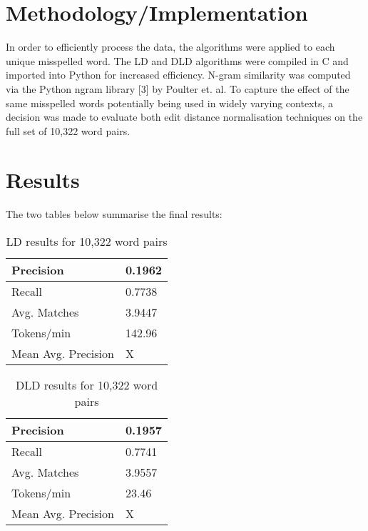 \documentclass[11pt]{article}
\begin{document}
\section{Methodology/Implementation}
In order to efficiently process the data, the algorithms were applied to each unique misspelled word.
The LD and DLD algorithms were compiled in C and imported into Python for increased efficiency. N-gram
similarity was computed via the Python ngram library [3] by Poulter et. al. To capture the effect of the same misspelled words potentially being used in widely varying contexts, a decision was made to evaluate both edit distance normalisation techniques on the full set of 10,322 word pairs. 


\section{Results}
The two tables below summarise the final results:

\begin{table}[h]
\begin{center}
\begin{tabular}{|l|l|}
      \hline
      Precision & 0.1962\\
      \hline
      Recall & 0.7738\\
      \hline
      Avg. Matches & 3.9447\\
      \hline
      Tokens/min & 142.96\\
      \hline
      Mean Avg. Precision & X\\
      \hline
\end{tabular}
\caption{LD results for 10,322 word pairs}\label{table1}
\end{center}
\end{table}


\begin{table}[h]
\begin{center}
\begin{tabular}{|l|l|}
      \hline
      Precision & 0.1957\\
      \hline
      Recall & 0.7741\\
      \hline
      Avg. Matches & 3.9557\\
      \hline
      Tokens/min & 23.46\\
      \hline
      Mean Avg. Precision & X\\
      \hline
\end{tabular}
\caption{DLD results for 10,322 word pairs}\label{table2}
\end{center}
\end{table}
\end{document}

